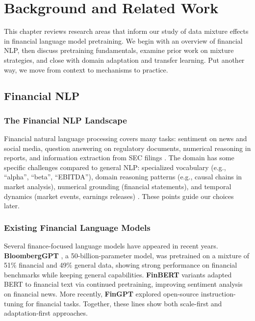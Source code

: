 \chapter{Background and Related Work}

This chapter reviews research areas that inform our study of data mixture effects in financial language model pretraining. We begin with an overview of financial NLP, then discuss pretraining fundamentals, examine prior work on mixture strategies, and close with domain adaptation and transfer learning. Put another way, we move from context to mechanisms to practice.

\section{Financial NLP}

\subsection{The Financial NLP Landscape}

Financial natural language processing covers many tasks: sentiment on news and social media, question answering on regulatory documents, numerical reasoning in reports, and information extraction from SEC filings \parencite{araci2019finbert, chen2021finqa}. The domain has some specific challenges compared to general NLP: specialized vocabulary (e.g., ``alpha'', ``beta'', ``EBITDA''), domain reasoning patterns (e.g., causal chains in market analysis), numerical grounding (financial statements), and temporal dynamics (market events, earnings releases) \parencite{wu2023bloomberggpt, araci2019finbert}. These points guide our choices later.

\subsection{Existing Financial Language Models}

Several finance-focused language models have appeared in recent years. \textbf{BloombergGPT} \parencite{wu2023bloomberggpt}, a 50-billion-parameter model, was pretrained on a mixture of 51\% financial and 49\% general data, showing strong performance on financial benchmarks while keeping general capabilities. \textbf{FinBERT} variants \parencite{araci2019finbert, yang2020finbert} adapted BERT to financial text via continued pretraining, improving sentiment analysis on financial news. More recently, \textbf{FinGPT} \parencite{yang2023fingpt} explored open-source instruction-tuning for financial tasks. Together, these lines show both scale-first and adaptation-first approaches.

